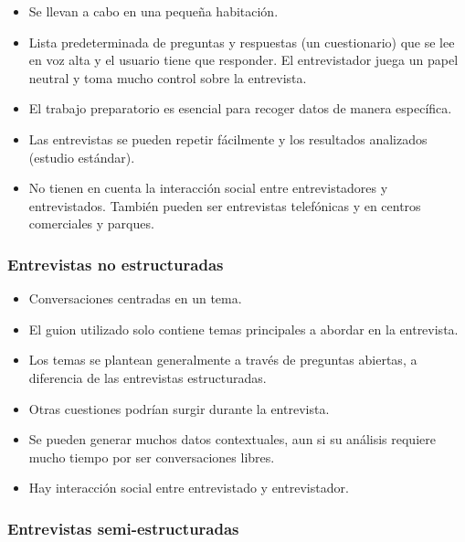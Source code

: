 \documentclass[12pt, twoside, openright]{report} %
\begin{document}
        \begin{itemize}
        
        \item
          Se llevan a cabo en una pequeña habitación.
        \item
          Lista predeterminada de preguntas y respuestas (un
          cuestionario) que se lee en voz alta y el usuario tiene que
          responder. El entrevistador juega un papel neutral y toma
          mucho control sobre la entrevista.
        \item
          El trabajo preparatorio es esencial para recoger datos de
          manera específica.
        \item
          Las entrevistas se pueden repetir fácilmente y los resultados
          analizados (estudio estándar).
        \item
          No tienen en cuenta la interacción social entre
          entrevistadores y entrevistados. También pueden ser
          entrevistas telefónicas y en centros comerciales y parques.
        \end{itemize}

\subsubsection{Entrevistas no estructuradas}

        \begin{itemize}
        
        \item
          Conversaciones centradas en un tema.
        \item
          El guion utilizado solo contiene temas principales a abordar
          en la entrevista.
        \item
          Los temas se plantean generalmente a través de preguntas
          abiertas, a diferencia de las entrevistas estructuradas.
        \item
          Otras cuestiones podrían surgir durante la entrevista.
        \item
          Se pueden generar muchos datos contextuales, aun si su
          análisis requiere mucho tiempo por ser conversaciones libres.
        \item
          Hay interacción social entre entrevistado y entrevistador.
        \end{itemize}

\subsubsection{Entrevistas semi-estructuradas}
\end{document}
